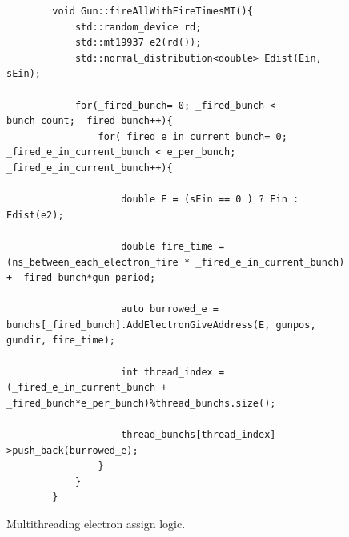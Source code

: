 \documentclass[a4paper,oneside,12pt]{report}
\numberwithin{equation}{chapter}
\begin{document}
\begin{figure}[H]
    \centering
    \begin{verbatim}
        void Gun::fireAllWithFireTimesMT(){
            std::random_device rd;
            std::mt19937 e2(rd());
            std::normal_distribution<double> Edist(Ein, sEin);
    
            for(_fired_bunch= 0; _fired_bunch < bunch_count; _fired_bunch++){
                for(_fired_e_in_current_bunch= 0; _fired_e_in_current_bunch < e_per_bunch; _fired_e_in_current_bunch++){
    
                    double E = (sEin == 0 ) ? Ein : Edist(e2);
    
                    double fire_time = (ns_between_each_electron_fire * _fired_e_in_current_bunch) + _fired_bunch*gun_period;
    
                    auto burrowed_e = bunchs[_fired_bunch].AddElectronGiveAddress(E, gunpos, gundir, fire_time);
    
                    int thread_index = (_fired_e_in_current_bunch + _fired_bunch*e_per_bunch)%thread_bunchs.size();
    
                    thread_bunchs[thread_index]->push_back(burrowed_e);
                }
            }
        }
    \end{verbatim}
    \vspace{20pt}
    \caption{Multithreading electron assign logic.}
    \label{fig:fireAllWithFireTimesMT}
\end{figure}
\end{document}
